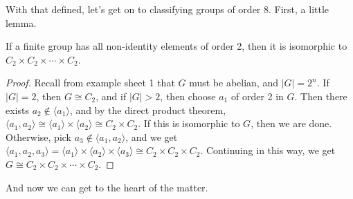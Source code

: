 \documentclass[a4paper]{scrartcl}
\begin{document}
With that defined, let's get on to classifying groups of order 8.
First, a little lemma.

\begin{lemma}
	If a finite group has all non-identity elements of order 2, then it is isomorphic to $C_2 \times C_2 \times \cdots \times C_2$.
\end{lemma}
\begin{proof}
	Recall from example sheet 1 that $G$ must be abelian, and $|G| = 2^n$. If $|G| = 2$, then $G \cong C_2$, and if $|G| > 2$, then choose $a_1$ of order 2 in $G$. Then there exists $a_2 \not \in \langle a_1 \rangle$, and by the direct product theorem, $\langle a_1, a_2 \rangle \cong \langle a_1 \rangle \times \langle a_2 \rangle \cong C_2 \times C_2$.
	If this is isomorphic to $G$, then we are done. Otherwise, pick $a_3 \not \in \langle a_1, a_2 \rangle$, and we get $\langle a_1, a_2, a_3 \rangle = \langle a_1 \rangle \times \langle a_2 \rangle \times \langle a_3 \rangle \cong C_2 \times C_2 \times C_2$. Continuing in this way, we get $G \cong C_2 \times C_2 \times \cdots \times C_2$. 
\end{proof}

And now we can get to the heart of the matter.
\end{document}

